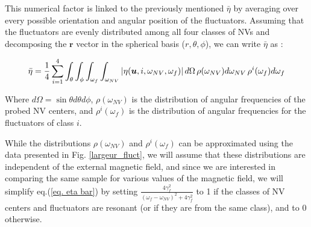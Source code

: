\documentclass[preprintnumbers,amsmath,amssymb,onecolumn,12pt]{revtex4-2}\usepackage{graphicx}%
\begin{document}
This numerical factor is linked to the previously mentioned $\bar \eta$ by averaging over every possible orientation and angular position of the fluctuators. Assuming that the fluctuators are evenly distributed among all four classes of NVs and decomposing the $\bm r$ vector in the spherical basis ($r, \theta, \phi$), we can write $\bar \eta$ as :

\begin{equation}
\label{eq. eta bar}
\bar \eta =\frac{1}{4} \sum_{i=1}^4 \int_\theta \int_\phi  \int_{\omega_f} \int_{\omega_{NV}}   \abs{\eta(\bm u,i,\omega_{NV},\omega_f)}\, d\Omega\, \rho(\omega_{NV}) d\omega_{NV}\, \rho^i(\omega_f) d\omega_f 
\end{equation}

Where $d\Omega=\sin \theta d\theta d\phi$, $\rho(\omega_{NV})$ is the distribution of angular frequencies of the probed NV centers, and  $\rho^i(\omega_f)$ is the distribution of angular frequencies  for the fluctuators of class $i$.

While the distributions $\rho(\omega_{NV})$ and $\rho^i(\omega_f)$ can be approximated using the data presented in Fig. \ref{largeur_fluct}, we will assume that these distributions are independent of the external magnetic field, and since we are interested in comparing the same sample for various values of the magnetic field, we will simplify eq.(\ref{eq. eta bar}) by setting $\frac{4\gamma_f^2}{(\omega_f - \omega_{NV})^2+4\gamma_f^2}$ to 1 if the classes of NV centers and fluctuators are resonant (or if they are from the same class), and to 0 otherwise.
\end{document}

